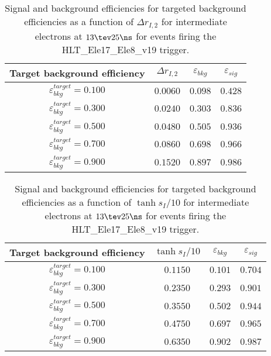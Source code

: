 \clearpage

\begin{table}[!bht]
  \begin{center}
    \begin{tabular}{cccc}
      \hline
      Target background efficiency & $\Delta r_{I,2}$ & $\varepsilon_{bkg}$ & $\varepsilon_{sig}$ \\ 
      \hline
      $\varepsilon_{bkg}^{target} = 0.100$ & $  0.0060$ & $0.098$ & $0.428$ \\
      $\varepsilon_{bkg}^{target} = 0.300$ & $  0.0240$ & $0.303$ & $0.836$ \\
      $\varepsilon_{bkg}^{target} = 0.500$ & $  0.0480$ & $0.505$ & $0.936$ \\
      $\varepsilon_{bkg}^{target} = 0.700$ & $  0.0860$ & $0.698$ & $0.966$ \\
      $\varepsilon_{bkg}^{target} = 0.900$ & $  0.1520$ & $0.897$ & $0.986$ \\
      \hline
    \end{tabular}
    \caption{Signal and background efficiencies for targeted background efficiencies as a function of $\Delta r_{I,2}$ for intermediate electrons at $13\tev 25\ns$ for events firing the HLT\_Ele17\_Ele8\_v19 trigger.}
    \label{tab:eff_rej_r2I_beam_13_25_trigger_17_8_I}
  \end{center}
\end{table}

\clearpage

\begin{table}[!bht]
  \begin{center}
    \begin{tabular}{cccc}
      \hline
      Target background efficiency & $\tanh{s_I/10}$ & $\varepsilon_{bkg}$ & $\varepsilon_{sig}$ \\ 
      \hline
      $\varepsilon_{bkg}^{target} = 0.100$ & $  0.1150$ & $0.101$ & $0.704$ \\
      $\varepsilon_{bkg}^{target} = 0.300$ & $  0.2350$ & $0.293$ & $0.901$ \\
      $\varepsilon_{bkg}^{target} = 0.500$ & $  0.3550$ & $0.502$ & $0.944$ \\
      $\varepsilon_{bkg}^{target} = 0.700$ & $  0.4750$ & $0.697$ & $0.965$ \\
      $\varepsilon_{bkg}^{target} = 0.900$ & $  0.6350$ & $0.902$ & $0.987$ \\
      \hline
    \end{tabular}
    \caption{Signal and background efficiencies for targeted background efficiencies as a function of $\tanh{s_I/10}$ for intermediate electrons at $13\tev 25\ns$ for events firing the HLT\_Ele17\_Ele8\_v19 trigger.}
    \label{tab:eff_rej_sI_beam_13_25_trigger_17_8_I}
  \end{center}
\end{table}

